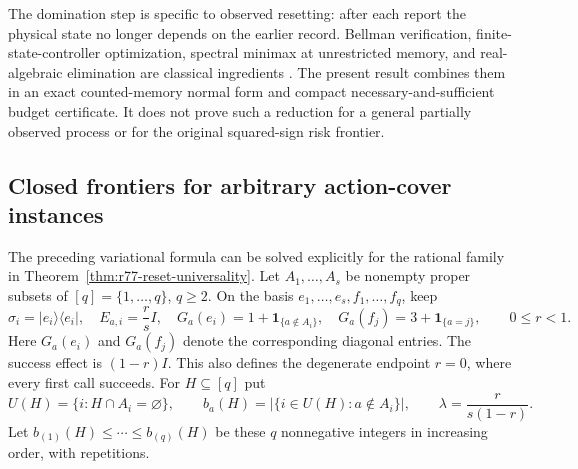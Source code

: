 The domination step is specific to observed resetting: after each
report the physical state no longer depends on the earlier record.
Bellman verification, finite-state-controller optimization, spectral
minimax at unrestricted memory, and real-algebraic elimination are
classical ingredients
\cite{BertsekasTsitsiklis91,Meuleau99,PoupartBoutilier03,AmatoBernsteinZilberstein10,Seidenberg54}.
The present result combines them in an exact
counted-memory normal form and compact necessary-and-sufficient
budget certificate.  It does not prove such a reduction for a
general partially observed process or for the original squared-sign
risk frontier.

\subsection{Closed frontiers for arbitrary action-cover instances}

The preceding variational formula can be solved explicitly for the
rational family in Theorem~\ref{thm:r77-reset-universality}.  Let
$A_1,\ldots,A_s$ be nonempty proper subsets of $[q]=\{1,\ldots,q\}$,
$q\ge2$.  On the basis $e_1,\ldots,e_s,f_1,\ldots,f_q$, keep
\[
 \sigma_i=|e_i\rangle\langle e_i|,\quad E_{a,i}=\frac rs I,
 \quad G_a(e_i)=1+\mathbf1_{\{a\notin A_i\}},\quad
 G_a(f_j)=3+\mathbf1_{\{a=j\}},\qquad 0\le r<1.
\]
Here $G_a(e_i)$ and $G_a(f_j)$ denote the corresponding diagonal
entries.  The success effect is $(1-r)I$.  This also defines the
degenerate endpoint $r=0$, where every first call succeeds.  For
$H\subseteq[q]$ put
\[
 U(H)=\{i:H\cap A_i=\varnothing\},\qquad
 b_a(H)=|\{i\in U(H):a\notin A_i\}|,
 \qquad \lambda=\frac{r}{s(1-r)}.
\]
Let $b_{(1)}(H)\le\cdots\le b_{(q)}(H)$ be these $q$ nonnegative
integers in increasing order, with repetitions.

